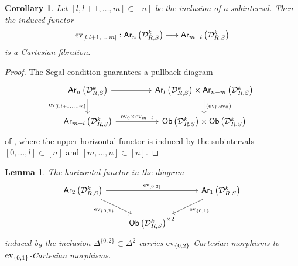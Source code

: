\documentclass[10pt, reqno, twoside
, final
]{amsart}
\numberwithin{equation}{subsection}%
\theoremstyle{definition}
\theoremstyle{definition}
\theoremstyle{definition}
\theoremstyle{definition}
\theoremstyle{definition}
\theoremstyle{definition}
\theoremstyle{definition}
\theoremstyle{definition}
\theoremstyle{definition}
\theoremstyle{plain}
\theoremstyle{definition}
\theoremstyle{plain}
\theoremstyle{definition}
\theoremstyle{plain}
\newtheorem{cor}[defn]{Corollary}
\theoremstyle{definition}
\theoremstyle{definition}
\theoremstyle{plain}
\newtheorem{lem}[defn]{Lemma}
\theoremstyle{plain}
\theoremstyle{definition}
\theoremstyle{plain}
\theoremstyle{plain}
\theoremstyle{plain}
\begin{document}
\begin{cor}\label{cor:subintcartesian}
Let $[l,l+1,\ldots,m]\subset [n]$ be the inclusion of a subinterval. Then the induced functor 
\[ \mathrm{ev}_{[l,l+1,\ldots,m]}:\mathsf{Ar}_n\left(\mathcal{D}^k_{R,S}\right) \longrightarrow \mathsf{Ar}_{m-l}\left(\mathcal{D}^k_{R,S}\right)  \]
is a Cartesian fibration.
\end{cor}
\begin{proof}
The Segal condition guarantees a pullback diagram 
\[
\begin{tikzcd}
\mathsf{Ar}_n\left(\icatd^k_{R,S}\right) \ar[d,"\ev_{[l,l+1,\ldots,m]}"'] \ar[r] &[2em] \mathsf{Ar}_{l}\left(\icatd^k_{R,S}\right) \times\mathsf{Ar}_{n-m}\left(\icatd^k_{R,S}\right) \ar[d,"(\ev_l{,}\ev_0)"] \\
\mathsf{Ar}_{m-l}\left(\icatd^k_{R,S}\right) \ar[r,"\ev_0\times\ev_{m-l}"] &[2em] \mathsf{Ob}\left(\icatd^k_{R,S}\right)\times \mathsf{Ob}\left(\icatd^k_{R,S}\right)
\end{tikzcd}
\]
of \infcatst, where the upper horizontal functor is induced by the subintervals $[0,\ldots,l]\subset [n]$ and $[m,\ldots,n]\subset [n]$.
\end{proof}
\begin{lem}\label{lem:composition-preserve-Cartesianmorphisms}
The horizontal functor in the diagram 
\[
\begin{tikzcd}
    \mathsf{Ar}_2\left(\icatd_{R,S}^k\right) \ar[rr,"\ev_{[0,2]}"] \ar[dr,"\ev_{\{0{,}2\}}"'] && \mathsf{Ar}_1\left(\icatd_{R,S}^k\right) \ar[dl,"\ev_{\{0{,}1\}}"] \\
    &\mathsf{Ob}\left(\icatd_{R,S}^k\right)^{\times 2} 
\end{tikzcd}
\]
induced by the inclusion $\Delta^{\{0,2\}}\subset\Delta^2$ carries $\mathrm{ev}_{\{0,2\}}$-Cartesian morphisms to $\mathrm{ev}_{\{0,1\}}$-Cartesian morphisms. 
\end{lem}
\end{document}
